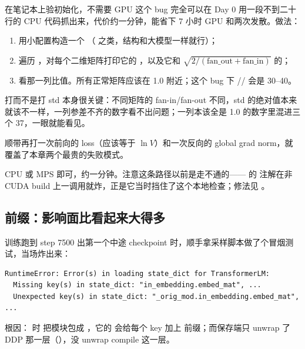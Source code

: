 \begin{tipbox}{在笔记本上验初始化，不需要 GPU}
这个 bug 完全可以在 Day 0 用一段不到二十行的 CPU 代码抓出来，代价约一分钟，能省下 7 小时 GPU 和两次发散。做法：

\begin{enumerate}[label=\arabic*.]\itemsep2pt
  \item 用小配置构造一个 （ 之类，结构和大模型一样就行）；
  \item 遍历 ，对每个二维矩阵打印它的 ，以及它和 $\sqrt{2/(\mbox{fan\_out}+\mbox{fan\_in})}$ 的；
  \item 看那一列比值。所有正常矩阵应该在 1.0 附近；这个 bug 下 // 会是 30--40。
\end{enumerate}

打而不是打 std 本身很关键：不同矩阵的 fan-in/fan-out 不同，std 的绝对值本来就该不一样，一列参差不齐的数字看不出问题；一列本该全是 1.0 的数字里混进三个 37，一眼就能看见。

顺带再打一次前向的 loss（应该等于 $\ln V$）和一次反向的 global grad norm，就覆盖了本章两个最贵的失败模式。

\resources CPU 或 MPS 即可，约一分钟。注意这条路径以前是走不通的—— 的  注解在非 CUDA build 上一调用就炸，正是它当时挡住了这个本地检查；修法见 。
\end{tipbox}

\subsection{ 前缀：影响面比看起来大得多}
\label{subsec:orig-mod}

训练跑到 step 7500 出第一个中途 checkpoint 时，顺手拿采样脚本做了个冒烟测试，当场炸出来：

\begin{lstlisting}[style=hlrepl]
RuntimeError: Error(s) in loading state_dict for TransformerLM:
  Missing key(s) in state_dict: "in_embedding.embed_mat", ...
  Unexpected key(s) in state_dict: "_orig_mod.in_embedding.embed_mat", ...
\end{lstlisting}

根因： 时  把模块包成 ，它的  会给每个 key 加上  前缀；而保存端只 unwrap 了 DDP 那一层（），没 unwrap compile 这一层。

